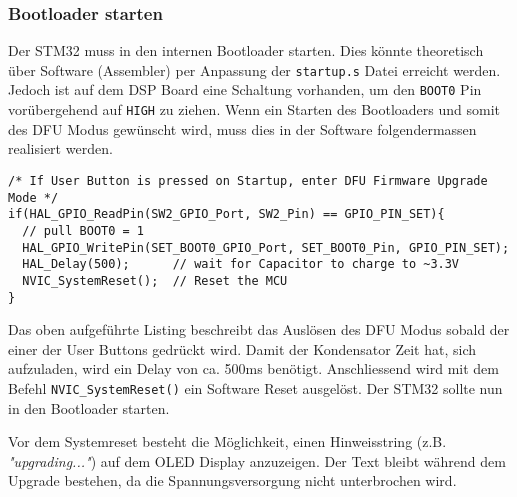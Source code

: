 \subsubsection{Bootloader starten}
\label{sec:Enter_DFU}

Der STM32 muss in den internen Bootloader starten. Dies könnte theoretisch über Software (Assembler) per Anpassung der \texttt{startup.s} Datei erreicht werden.
Jedoch ist auf dem DSP Board eine Schaltung vorhanden, um den \texttt{BOOT0} Pin vorübergehend auf \texttt{HIGH} zu ziehen.
Wenn ein Starten des Bootloaders und somit des DFU Modus gewünscht wird, muss dies in der Software folgendermassen realisiert werden.
\\
\begin{lstlisting}[style=Cuvision,caption={Starten des Bootloaders durch CPU Reset}]
/* If User Button is pressed on Startup, enter DFU Firmware Upgrade Mode */
if(HAL_GPIO_ReadPin(SW2_GPIO_Port, SW2_Pin) == GPIO_PIN_SET){
  // pull BOOT0 = 1
  HAL_GPIO_WritePin(SET_BOOT0_GPIO_Port, SET_BOOT0_Pin, GPIO_PIN_SET);
  HAL_Delay(500);      // wait for Capacitor to charge to ~3.3V
  NVIC_SystemReset();  // Reset the MCU
}
\end{lstlisting}

Das oben aufgeführte Listing beschreibt das Auslösen des DFU Modus sobald der einer der User Buttons gedrückt wird.
Damit der Kondensator Zeit hat, sich aufzuladen, wird ein Delay von ca. 500ms benötigt.
Anschliessend wird mit dem Befehl \texttt{NVIC\_SystemReset()} ein Software Reset ausgelöst.
Der STM32 sollte nun in den Bootloader starten.

Vor dem Systemreset besteht die Möglichkeit, einen Hinweisstring (z.B. \textit{"upgrading..."}) auf dem OLED Display anzuzeigen.
Der Text bleibt während dem Upgrade bestehen, da die Spannungsversorgung nicht unterbrochen wird.



